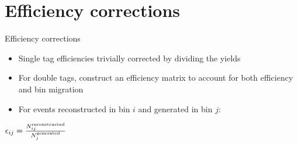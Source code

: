 \documentclass{beamer}
\begin{document}
\section{Efficiency corrections}
\begin{frame}{Efficiency corrections}
  \begin{itemize}
    \setlength\itemsep{1.5em}
    \item{Single tag efficiencies trivially corrected by dividing the yields}
    \item{For double tags, construct an efficiency matrix to account for both efficiency and bin migration}
    \item{For events reconstructed in bin $i$ and generated in bin $j$:}
  \end{itemize}
  \begin{center}
    $\epsilon_{ij} = \frac{N^{\rm reconstructed}_{ij}}{N^{\rm generated}_j}$
  \end{center}
\end{frame}
\end{document}
